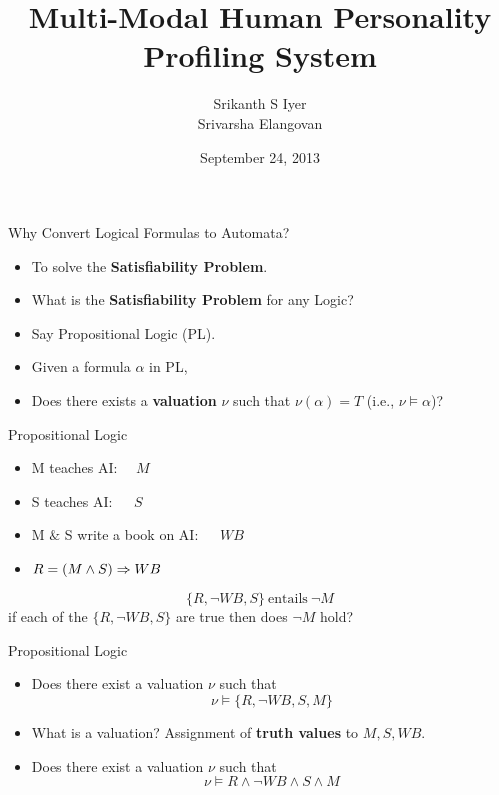 \documentclass[xcolor=dvipsnames]{beamer}
\title[]{Multi-Modal Human Personality Profiling System}
\author{Srikanth S Iyer\\Srivarsha Elangovan}
\institute[SSNCE]{SSN College of Engineering, Chennai
}
\date{September 24, 2013}
\begin{document}
\begin{frame}
\maketitle
\end{frame}





\begin{frame}{Why Convert Logical Formulas to Automata?}
\pause
\begin{itemize}
\item To solve the {\bf Satisfiability Problem}.
\pause
\item What is the {\bf Satisfiability Problem} for any Logic?
\pause
\item Say Propositional Logic (PL).
\pause
\item Given a formula $\alpha$ in PL, 
\item Does there exists a {\bf valuation} $\nu$ such that $\nu(\alpha)=T$ (i.e., $\nu \models \alpha$)? 
\end{itemize}
\end{frame}
%
\begin{frame}{Propositional Logic}
\begin{itemize}
\item M teaches AI:$~~~~~~M$
\item S teaches AI:$~~~~~~~S$
\item M $\&$ S write a book on AI:$~~~~~~~WB$
%
\pause
\item $R=(M\land S)\Rightarrow WB$
%
\pause

\end{itemize}
\[\{R,\lnot WB,S\}~\mbox{entails}~\lnot M\]
\pause
if each of the $\{R,\lnot WB,S\}$ are true then does $\lnot M$ hold?
\end{frame}

\begin{frame}{Propositional Logic}
\begin{itemize}
\item Does there exist a valuation $\nu$ such that 
\[\nu \models\{R,\lnot WB,S, M\}\]
\pause
\item What is a valuation?
\pause
Assignment of {\bf truth values} to $M,S,WB$.
\pause
\item Does there exist a valuation $\nu$ such that 
\[\nu \models R \land \lnot WB\land S\land M\]
\end{itemize}
\end{frame}
\end{document}
